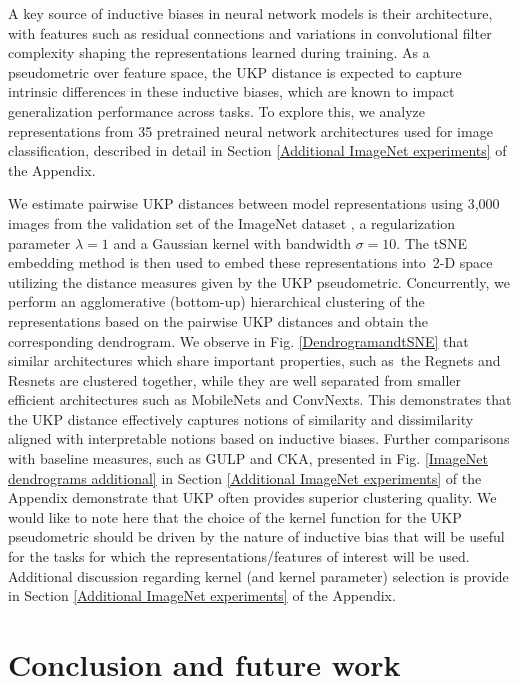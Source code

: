 \documentclass{article}
\theoremstyle{plain}
\newcommand{\metricstname}{UKP }
\begin{document}
 A key source of inductive biases in neural network models is their architecture, with features such as residual connections and variations in convolutional filter complexity shaping the representations learned during training. As a pseudometric over feature space, the \metricstname distance is expected to capture intrinsic differences in these inductive biases, which are known to impact generalization performance across tasks. To explore this, we analyze representations from 35 pretrained neural network architectures used for image classification, described in detail in Section \ref{Additional ImageNet experiments} of the Appendix.

 We estimate pairwise \metricstname distances between model representations using 3,000 images from the validation set of the ImageNet dataset \cite{krizhevsky2012imagenet}, a regularization parameter $\lambda=1$ and a Gaussian kernel with bandwidth $\sigma=10$. The tSNE embedding method is then used to embed these representations into 2-D space utilizing the distance measures given by the \metricstname pseudometric. Concurrently, we perform an agglomerative (bottom-up) hierarchical clustering of the representations based on the pairwise \metricstname distances and obtain the corresponding dendrogram. We observe in Fig. \ref{DendrogramandtSNE} that similar architectures which share important properties, such as the Regnets and Resnets are clustered together, while they are well separated from smaller efficient architectures such as MobileNets and ConvNexts. This demonstrates that the \metricstname distance effectively captures notions of similarity and dissimilarity aligned with interpretable notions based on inductive biases. Further comparisons with baseline measures, such as GULP and CKA, presented in Fig. \ref{ImageNet dendrograms additional} in Section \ref{Additional ImageNet experiments} of the Appendix demonstrate that \metricstname often provides superior clustering quality. We would like to note here that the choice of the kernel function for the \metricstname pseudometric should be driven by the nature of inductive bias that will be useful for the tasks for which the representations/features of interest will be used. Additional discussion regarding kernel (and kernel parameter) selection is provide in Section \ref{Additional ImageNet experiments} of the Appendix.
 
\section{Conclusion and future work} \label{conclusion}
\end{document}

